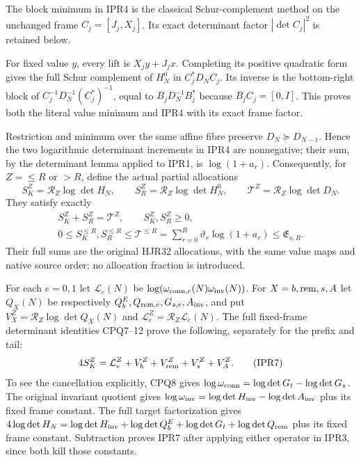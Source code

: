 \documentclass[11pt,a4paper]{article}
\begin{document}
The block minimum in IPR4 is the classical Schur-complement
method \cite[\S2.1, (2.3)--(2.4)]{human:boyd1994} on the
unchanged frame $C_j=[J_j,X_j]$.
Its exact determinant factor $|\det C_j|^2$ is retained below.

For fixed value $y$, every lift is $X_jy+J_jx$. Completing its
positive quadratic form gives the full Schur complement of
$H^0_N$ in $C_j^*D_NC_j$. Its inverse is the bottom-right block
of $C_j^{-1}D_N^{-1}(C_j^*)^{-1}$, equal to
$B_jD_N^{-1}B_j^*$ because $B_jC_j=[0,I]$. This proves both
the literal value minimum and IPR4 with its exact frame factor.

Restriction and minimum over the same affine fibre preserve
$D_N\succeq D_{N-1}$. Hence the two logarithmic determinant
increments in IPR4 are nonnegative; their sum, by the determinant
lemma applied to IPR1, is $\log(1+a_r)$. Consequently, for
$Z=\le R$ or $>R$, define the actual partial allocations
\[
 S_K^Z=\mathcal R_Z\log\det H_N,\qquad
 S_R^Z=\mathcal R_Z\log\det H^0_N,\qquad
 \mathcal T^Z=\mathcal R_Z\log\det D_N .                \tag{IPR5}
\]
They satisfy exactly
\[
\begin{gathered}
 S_K^Z+S_R^Z=\mathcal T^Z,\qquad S_K^Z,S_R^Z\ge0,\\
 0\le S_K^{\le R},S_R^{\le R}\le\mathcal T^{\le R}
     =\sum_{r=0}^R\vartheta_r\log(1+a_r)
     \le\mathfrak E_{s,R} .                             \tag{IPR6}
\end{gathered}
\]
Their full sums are the original HJR32 allocations, with the same
value maps and native source order; no allocation fraction is introduced.

For each $e=0,1$ let $\mathcal L_e(N)$ be
$\log(\omega_{{\rm conn},e}(N)\omega_{\rm inv}(N))$.
For $X=b,{\rm rem},s,A$ let $Q_X(N)$ be respectively
$Q_b^E,Q_{{\rm rem},e},G_{s,e},A_{\rm inv}$, and put
$V_X^Z=\mathcal R_Z\log\det Q_X(N)$ and
$\mathcal L_e^Z=\mathcal R_Z\mathcal L_e(N)$.
The full fixed-frame determinant identities CPQ7--12 prove the
following, separately for the prefix and tail:
\[
 4S_K^Z=\mathcal L_e^Z+V_b^Z+V_{\rm rem}^Z+V_s^Z+V_A^Z . \tag{IPR7}
\]
To see the cancellation explicitly, CPQ8 gives
$\log\omega_{\rm conn}=\log\det G_t-\log\det G_s$.
The original invariant quotient gives
$\log\omega_{\rm inv}=\log\det H_{\rm inv}
-\log\det A_{\rm inv}$ plus its fixed frame constant.
The full target factorization gives
$4\log\det H_N=\log\det H_{\rm inv}+\log\det Q_b^E
+\log\det G_t+\log\det Q_{\rm rem}$ plus its fixed frame
constant. Subtraction proves IPR7 after applying either operator
in IPR3, since both kill those constants.
\end{document}
